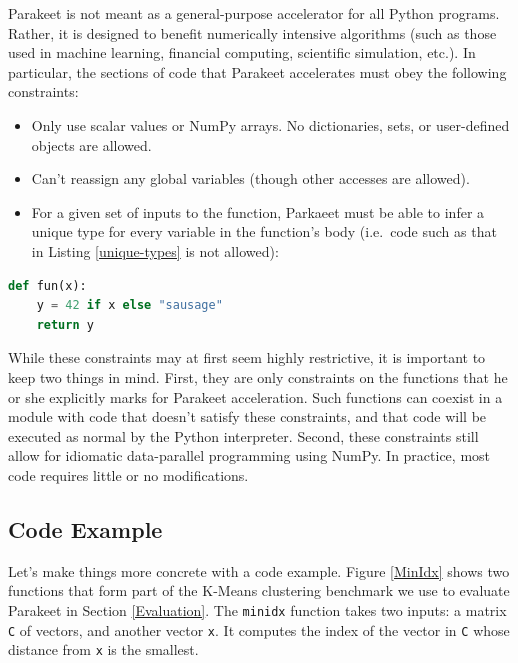 \documentclass[10pt,twocolumn]{article}
\begin{document}
Parakeet is not meant as a general-purpose accelerator for all Python programs.  Rather, it is designed to benefit numerically intensive algorithms (such as those used in machine learning, financial computing, scientific simulation, etc.).  In particular, the sections of code that Parakeet accelerates must obey the following constraints:

\begin{itemize}
 \item Only use scalar values or NumPy arrays.  No dictionaries, sets, or user-defined objects are allowed.
 \item Can't reassign any global variables (though other accesses are allowed).
 \item For a given set of inputs to the function, Parkaeet must be able to infer a unique type for every variable in the function's body (i.e.~code such as that in Listing \ref{unique-types} is not allowed):
\end{itemize}

\begin{lstlisting}[numbers=none,label=unique-types,caption=Type Inference Failure,language=Python,frame=single]
  def fun(x):
    y = 42 if x else "sausage"
    return y
\end{lstlisting}

While these constraints may at first seem highly restrictive, it is important to keep two things in mind.  First, they are only constraints on the functions that he or she explicitly marks for Parakeet acceleration.  Such functions can coexist in a module with code that doesn't satisfy these constraints, and that code will be executed as normal by the Python interpreter.  Second, these constraints still allow for idiomatic data-parallel programming using NumPy.  In practice, most code requires little or no modifications.

\subsection{Code Example}
Let's make things more concrete with a code example.  Figure \ref{MinIdx} shows two functions that form part of the K-Means clustering benchmark we use to evaluate Parakeet in Section \ref{Evaluation}.  The \texttt{minidx} function takes two inputs: a matrix \texttt{C} of vectors, and another vector \texttt{x}.  It computes the index of the vector in \texttt{C} whose distance from \texttt{x} is the smallest.
\end{document}
